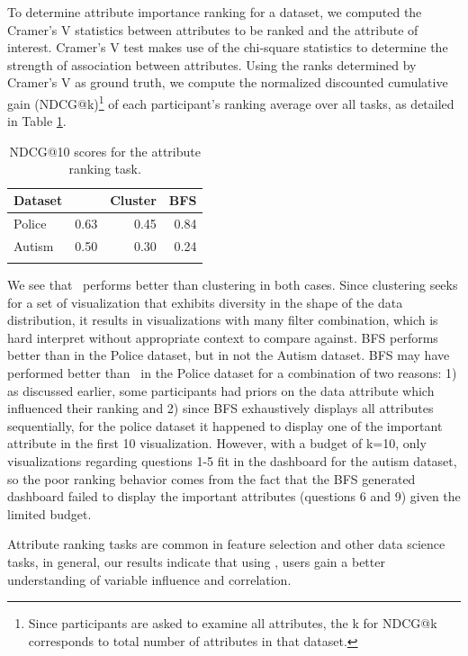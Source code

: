 To determine attribute importance ranking for a dataset, we computed the Cramer's V statistics between attributes to be ranked and the attribute of interest. Cramer's V test makes use of the chi-square statistics to determine the strength of association between attributes. Using the ranks determined by Cramer's V as ground truth, we compute the normalized discounted cumulative gain (NDCG@k)\footnote{Since participants are asked to examine all attributes, the k for NDCG@k corresponds to total number of attributes in that dataset.} of each participant's ranking average over all tasks, as detailed in Table \ref{table:ndcg_ranking_result}. 
\begin{table}[ht!]
	\centering
	\begin{tabular}{lrrr}
	\hline
	 Dataset   &   \system &   Cluster &   BFS \\
	\hline
	 Police    &      0.63 &      0.45 &  0.84 \\
	 Autism    &      0.50 &      0.30 &  0.24 \\
	\hline
	\label{table:ndcg_ranking_result}
	\end{tabular}
	\caption{NDCG@10 scores for the attribute ranking task.}
\end{table}
We see that \system\ performs better than clustering in both cases. Since clustering seeks for a set of visualization that exhibits diversity in the shape of the data distribution, it results in visualizations with many filter combination, which is hard interpret without appropriate context to compare against. BFS performs better than \system in the Police dataset, but in not the Autism dataset. BFS may have performed better than \system\ in the Police dataset for a combination of two reasons: 1) as discussed earlier, some participants had priors on the data attribute which influenced their ranking and 2) since BFS exhaustively displays all attributes sequentially, for the police dataset it happened to display one of the important attribute in the first 10 visualization. However, with a budget of k=10, only visualizations regarding questions 1-5 fit in the dashboard for the autism dataset, so the poor ranking behavior comes from the fact that the BFS generated dashboard failed to display the important attributes (questions 6 and 9) given the limited budget. 
\par Attribute ranking tasks are common in feature selection and other data science tasks, in general, our results indicate that using \system, users gain a better understanding of variable influence and correlation. 

